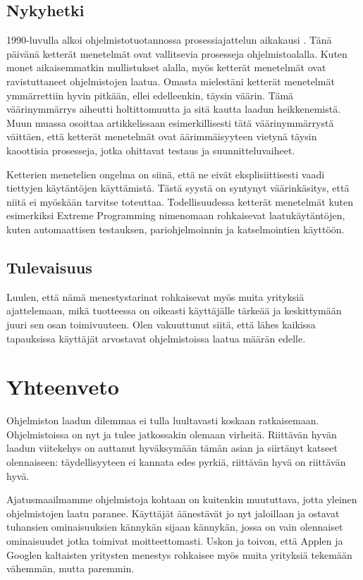 \documentclass[a4paper]{article}
\begin{document}
\subsection{Nykyhetki}

1990-luvulla alkoi ohjelmistotuotannossa prosessiajattelun aikakausi \citep{whittaker2002}. Tänä päivänä ketterät menetelmät ovat vallitsevia prosesseja ohjelmistoalalla. Kuten monet aikaisemmatkin mullistukset alalla, myös ketterät menetelmät ovat ravistuttaneet ohjelmistojen laatua. Omasta mielestäni ketterät menetelmät ymmärrettiin hyvin pitkään, ellei edelleenkin, täysin väärin. Tämä väärinymmärrys aiheutti holtittomuutta ja sitä kautta laadun heikkenemistä. Muun muassa \citet{whittaker2002} osoittaa artikkelissaan esimerkillisesti tätä väärinymmärrystä väittäen, että ketterät menetelmät ovat äärimmäisyyteen vietynä täysin kaoottisia prosesseja, jotka ohittavat testaus ja suunnitteluvaiheet.

Ketterien menetelien ongelma on siinä, että ne eivät eksplisiittisesti vaadi tiettyjen käytäntöjen käyttämistä. Tästä syystä on syntynyt väärinkäsitys, että niitä ei myöskään tarvitse toteuttaa. Todellisuudessa ketterät menetelmät kuten esimerkiksi Extreme Programming nimenomaan rohkaisevat laatukäytäntöjen, kuten automaattisen testauksen, pariohjelmoinnin ja katselmointien käyttöön.

\subsection{Tulevaisuus}

Luulen, että nämä menestystarinat rohkaisevat myös muita yrityksiä ajattelemaan, mikä tuotteessa on oikeasti käyttäjälle tärkeää ja keskittymään juuri sen osan toimivuuteen. Olen vakuuttunut siitä, että lähes kaikissa tapauksissa käyttäjät arvostavat ohjelmistoissa laatua määrän edelle.

\section{Yhteenveto}

Ohjelmiston laadun dilemmaa ei tulla luultavasti koskaan ratkaisemaan. Ohjelmistoissa on nyt ja tulee jatkossakin olemaan virheitä. Riittävän hyvän laadun viitekehys on auttanut hyväksymään tämän asian ja siirtänyt katseet olennaiseen: täydellisyyteen ei kannata edes pyrkiä, riittävän hyvä on riittävän hyvä. 

Ajatusmaailmamme ohjelmistoja kohtaan on kuitenkin muututtava, jotta yleinen ohjelmistojen laatu paranee. Käyttäjät äänestävät jo nyt jaloillaan ja ostavat tuhansien ominaisuuksien kännykän sijaan kännykän, jossa on vain olennaiset ominaisuudet jotka toimivat moitteettomasti. Uskon ja toivon, että Applen ja Googlen kaltaisten yritysten menestys rohkaisee myös muita yrityksiä tekemään vähemmän, mutta paremmin.



\end{document}

